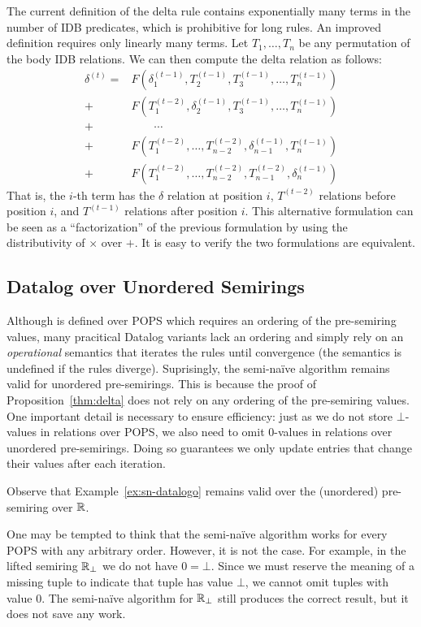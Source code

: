 The current definition of the delta rule contains
 exponentially many terms in the number of IDB predicates, 
 which is prohibitive for long rules.
An improved definition requires only linearly many terms.
Let $T_1, \ldots, T_n$ be any permutation of the body IDB relations. 
We can then compute the delta relation as follows:
%
\begin{align*}
\delta^{(t)} = & F(\delta_1^{(t-1)}, T_2^{(t-1)}, T_3^{(t-1)},\ldots, T_n^{(t-1)}) \\
 + & F(T_1^{(t-2)}, \delta_2^{(t-1)}, T_3^{(t-1)}, \ldots, T_n^{(t-1)}) \\
 + & \hspace{2em} \cdots  \\
 + & F(T_1^{(t-2)}, \ldots, T_{n-2}^{(t-2)}, \delta_{n-1}^{(t-1)}, T_n^{(t-1)}) \\
 + & F(T_1^{(t-2)}, \ldots, T_{n-2}^{(t-2)}, T_{n-1}^{(t-2)}, \delta_n^{(t-1)})
\end{align*}
%
That is, the $i$-th term has the $\delta$ relation at position $i$, 
 $T^{(t-2)}$ relations before position $i$, 
 and $T^{(t-1)}$ relations after position $i$.
This alternative formulation can be seen as a ``factorization'' 
 of the previous formulation by using the distributivity of 
 $\times$ over $+$. 
It is easy to verify the two formulations are equivalent.

\subsection{Datalog over Unordered Semirings}
\label{sec:unordered}
Although \datalogo is defined over POPS which requires an ordering of the pre-semiring values,
many pracitical Datalog variants lack an ordering and simply rely on an {\em operational} semantics
 that iterates the rules until convergence (the semantics is undefined if the rules diverge).
Suprisingly, the semi-na\"ive algorithm remains valid for unordered pre-semirings.
This is because the proof of Proposition~\ref{thm:delta} does not rely on any ordering of the pre-semiring values.
One important detail is necessary to ensure efficiency:
 just as we do not store $\bot$-values in relations over POPS, 
 we also need to omit $0$-values in relations over unordered pre-semirings.
Doing so guarantees we only update entries that change their values after each iteration.
%
\begin{ex}
\label{ex:unordered}
Observe that Example~\ref{ex:sn-datalogo} remains valid over the (unordered) pre-semiring over $\mathbb R$.
\end{ex}
%
One may be tempted to think that the semi-na\"ive algorithm works 
 for every POPS with any arbitrary order.
However, it is not the case.
For example, in the lifted semiring $\mathbb R_\bot$
 we do not have $0 = \bot$.
Since we must reserve the meaning of a missing tuple 
 to indicate that tuple has value $\bot$,
 we cannot omit tuples with value $0$.
The semi-na\"ive algorithm for $\mathbb R_\bot$ still produces the correct result,
 but it does not save any work.

